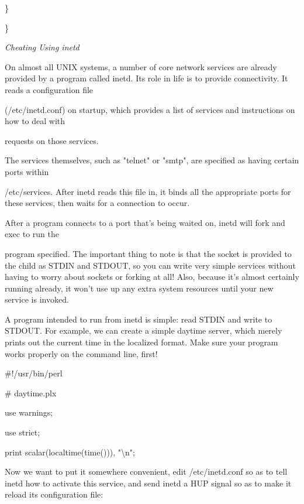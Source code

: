\documentclass[a4paper,11pt]{book}
\begin{document}
\noindent \}

\noindent \}

\noindent 

\noindent \textit{Cheating Using inetd}

\noindent On almost all UNIX systems, a number of core network services are already provided by a program called inetd. Its role in life is to provide connectivity. It reads a configuration file

\noindent (/etc/inetd.conf) on startup, which provides a list of services and instructions on how to deal with

\noindent requests on those services.

\noindent 

\noindent The services themselves, such as "telnet" or "smtp", are specified as having certain ports within

\noindent /etc/services. After inetd reads this file in, it binds all the appropriate ports for these services, then waits for a connection to occur.

\noindent 

\noindent After a program connects to a port that's being waited on, inetd will fork and exec to run the

\noindent program specified. The important thing to note is that the socket is provided to the child as STDIN and STDOUT, so you can write very simple services without having to worry about sockets or forking at all! Also, because it's almost certainly running already, it won't use up any extra system resources until your new service is invoked.

\noindent 

\noindent A program intended to run from inetd is simple: read STDIN and write to STDOUT. For example, we can create a simple daytime server, which merely prints out the current time in the localized format. Make sure your program works properly on the command line, first!

\noindent 

\noindent \#!/usr/bin/perl

\noindent \# daytime.plx

\noindent use warnings;

\noindent use strict;

\noindent 

\noindent print scalar(localtime(time())), "\textbackslash n";

\noindent 

\noindent Now we want to put it somewhere convenient, edit /etc/inetd.conf so as to tell inetd how to activate this service, and send inetd a HUP signal so as to make it reload its configuration file:
\end{document}
